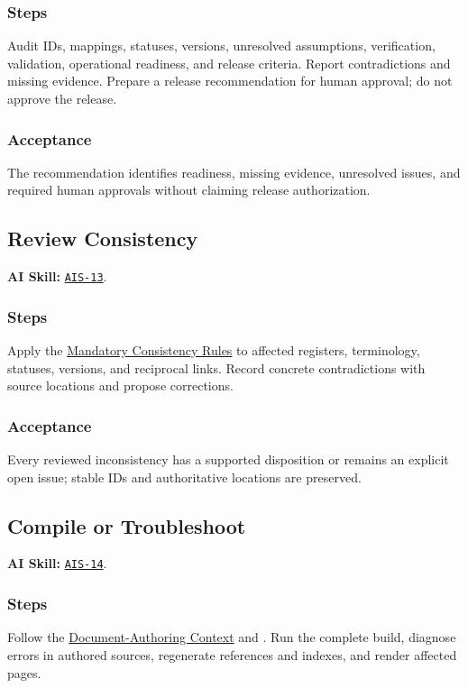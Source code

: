 \subsubsection*{Steps}
\label{Section:AIReleaseTaskSteps}
Audit IDs, mappings, statuses, versions, unresolved assumptions, verification,
validation, operational readiness, and release criteria. Report contradictions
and missing evidence. Prepare a release recommendation for human approval; do
not approve the release.

\subsubsection*{Acceptance}
\label{Section:AIReleaseAcceptance}
The recommendation identifies readiness, missing evidence, unresolved issues, and required human approvals without claiming release authorization.

\subsection{Review Consistency}
\label{Section:AIConsistencySteps}
\noindent\textbf{AI Skill:} \hyperref[Skill:AIS-13]{\texttt{AIS-13}}.

\subsubsection*{Steps}
\label{Section:AIConsistencyTaskSteps}
Apply the \hyperref[Section:AIConsistencyRules]{Mandatory Consistency Rules} to affected registers, terminology, statuses, versions, and reciprocal links. Record concrete contradictions with source locations and propose corrections.

\subsubsection*{Acceptance}
\label{Section:AIConsistencyAcceptance}
Every reviewed inconsistency has a supported disposition or remains an explicit open issue; stable IDs and authoritative locations are preserved.

\subsection{Compile or Troubleshoot}
\label{Section:AIBuildSteps}
\noindent\textbf{AI Skill:} \hyperref[Skill:AIS-14]{\texttt{AIS-14}}.

\subsubsection*{Steps}
\label{Section:AIBuildTaskSteps}
Follow the \hyperref[Section:AIDocumentContext]{Document-Authoring Context} and . Run the complete build, diagnose errors in authored sources, regenerate references and indexes, and render affected pages.

